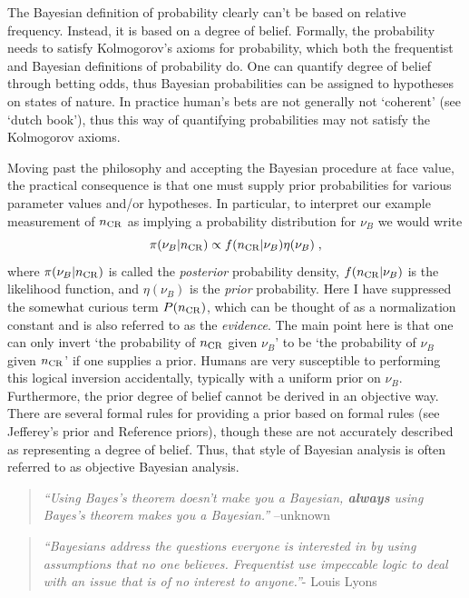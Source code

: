 \documentclass{cernrep}
\begin{document}
The Bayesian definition of probability clearly can't be based on relative frequency.  Instead, it is based on a degree of belief.  Formally, the probability needs to satisfy Kolmogorov's axioms for probability, which both the frequentist and Bayesian definitions of probability do.  One can quantify degree of belief through betting odds, thus Bayesian probabilities can be assigned to hypotheses on states of nature.  In practice human's bets are not generally not `coherent' (see `dutch book'), thus this way of quantifying probabilities may not satisfy the Kolmogorov axioms.

Moving past the philosophy and accepting the Bayesian procedure at face value, the practical consequence is that one must supply prior probabilities for various parameter values and/or hypotheses.  In particular, to interpret our example measurement of $n_{\rm CR}$ as implying a probability distribution for $\nu_B$ we would write
\begin{equation}
\pi(\nu_B | n_{\rm CR}) \propto f(n_{\rm CR} | \nu_B) \eta(\nu_B) \; ,
\end{equation}
where $\pi(\nu_B | n_{\rm CR})$ is called the \textit{posterior} probability density, $f(n_{\rm CR} | \nu_B)$ is the likelihood function, and $\eta(\nu_B)$ is the \textit{prior} probability.  Here I have suppressed the somewhat curious term $P(n_{\rm CR})$, which can be thought of as a normalization constant and is also referred to as the \textit{evidence}.  The main point here is that one can only invert `the probability of $n_{\rm CR}$ given $\nu_B$' to be `the probability of $\nu_B$ given $n_{\rm CR}$' if one supplies a prior.  Humans are very susceptible to performing this logical inversion accidentally, typically with a uniform prior on $\nu_B$.  Furthermore, the prior degree of belief cannot be derived in an objective way.  There are several formal rules for providing a prior based on formal rules (see Jefferey's prior and Reference priors), though these are not accurately described as representing a degree of belief.  Thus, that style of Bayesian analysis is often referred to as objective Bayesian analysis.

{}
\begin{quote}
{\em ``Using Bayes's theorem doesn't make you a Bayesian, \textbf{always} using Bayes's theorem makes you a Bayesian.''} --unknown
\end{quote}
\begin{quote}
{\em
``Bayesians address the questions everyone is interested in by using assumptions that no one believes.
Frequentist use impeccable logic to deal with an issue that is of no interest to anyone.''}- Louis Lyons
\end{quote}
\end{document}
